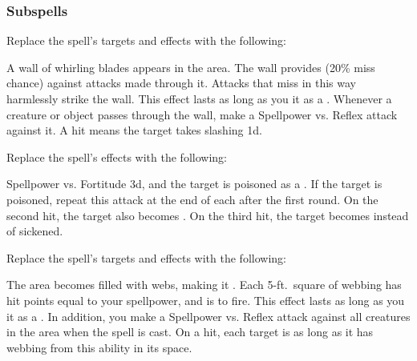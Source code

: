 \subsubsection{Subspells}
Replace the spell's targets and effects with the following:
\begin{spellcontent}
\begin{augmenttargetinginfo}
\end{augmenttargetinginfo}
\begin{augmenteffects}
\spelleffect
A wall of whirling blades appears in the area.
The wall provides  (20\% miss chance) against attacks made through it.
Attacks that miss in this way harmlessly strike the wall.
This effect lasts as long as you  it as a .
Whenever a creature or object passes through the wall, make a Spellpower vs. Reflex attack against it.
A hit means the target takes slashing  \minus1d.
\end{augmenteffects}
\end{spellcontent}
Replace the spell's effects with the following:
\begin{spellcontent}
\begin{augmenteffects}
\begin{spellattack}{Spellpower vs. Fortitude}
\spellsuccess
{} \minus3d, and the target is poisoned as a .
If the target is poisoned, repeat this attack at the end of each  after the first round.
On the second hit, the target also becomes .
On the third hit, the target becomes  instead of sickened.
\end{spellattack}
\end{augmenteffects}
\end{spellcontent}
Replace the spell's targets and effects with the following:
\begin{spellcontent}
\begin{augmenttargetinginfo}
\end{augmenttargetinginfo}
\begin{augmenteffects}
\spelleffect
The area becomes filled with webs, making it .
Each 5-ft.\ square of webbing has hit points equal to your spellpower, and is  to fire.
This effect lasts as long as you  it as a .
In addition, you make a Spellpower vs. Reflex attack against all creatures in the area when the spell is cast.
On a hit, each target is \immobilized as long as it has webbing from this ability in its space.
\end{augmenteffects}
\end{spellcontent}
